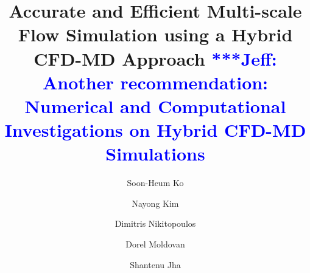 \documentclass[preprint,12pt]{elsarticle}
\newcommand{\skonote}[1]{ {\textcolor{blue} { ***Jeff: #1 }}}
\newcommand{\skonote}[1]{}
\begin{document}
\begin{frontmatter}



\title{Accurate and Efficient Multi-scale Flow Simulation using a Hybrid CFD-MD Approach\skonote{Another recommendation: Numerical and Computational Investigations on Hybrid CFD-MD Simulations}}

\author[add1]{Soon-Heum Ko}
\author[add1]{Nayong Kim}
\author[add3]{Dimitris Nikitopoulos}
\author[add3]{Dorel Moldovan}
\author[add1,add2]{Shantenu Jha}
\address[add1]{Center for Computation \& Technology, Louisiana State University, Baton Rouge, LA 70803, USA}
\address[add2]{Department of Computer Science, Louisiana State University, Baton Rouge, LA 70803, USA}
\address[add3]{Department of Mechanical Engineering, Louisiana State University, Baton Rouge, LA 70803, USA}


\end{frontmatter}
\end{document}
